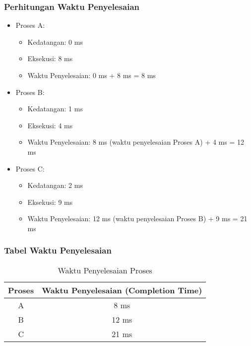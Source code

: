 \documentclass[12pt]{article}
\begin{document}
\subsubsection{Perhitungan Waktu Penyelesaian}

\begin{itemize}
    \item Proses A:
    \begin{itemize}
        \item Kedatangan: 0 ms
        \item Eksekusi: 8 ms
        \item Waktu Penyelesaian: 0 ms + 8 ms = 8 ms
    \end{itemize}
    \item Proses B:
    \begin{itemize}
        \item Kedatangan: 1 ms
        \item Eksekusi: 4 ms
        \item Waktu Penyelesaian: 8 ms (waktu penyelesaian Proses A) + 4 ms = 12 ms
    \end{itemize}
    \item Proses C:
    \begin{itemize}
        \item Kedatangan: 2 ms
        \item Eksekusi: 9 ms
        \item Waktu Penyelesaian: 12 ms (waktu penyelesaian Proses B) + 9 ms = 21 ms
    \end{itemize}
\end{itemize}

\subsubsection{Tabel Waktu Penyelesaian}

\begin{table}[h]
\centering
\begin{tabular}{|c|c|}
\hline
\textbf{Proses} & \textbf{Waktu Penyelesaian (Completion Time)} \\
\hline
A & 8 ms \\
\hline
B & 12 ms \\
\hline
C & 21 ms \\
\hline
\end{tabular}
\caption{Waktu Penyelesaian Proses}
\label{tab:completion_time}
\end{table}
\end{document}

